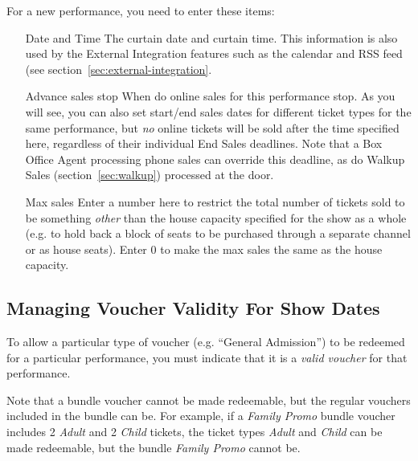 For a new performance, you need to enter these items:
\begin{enumerate}
\item[Date and Time] The curtain date and curtain time.  This
  information is also used by the External Integration features such as
  the calendar and RSS feed (see section~\ref{sec:external-integration}.
\item[Advance sales stop] When do online sales for this performance
  stop.  As you will see, you can also set start/end sales dates for
  different ticket types for the same performance, but \emph{no} online
  tickets will be sold after the time specified here, regardless of
  their individual End Sales deadlines.  Note that a Box Office Agent
  processing phone sales can override this deadline, as do Walkup
  Sales (section~\ref{sec:walkup}) processed at the door.
\item[Max sales] Enter a number here to restrict the total number of
  tickets sold to be something \emph{other} than the house capacity
  specified for the show as a whole (e.g. to hold back a block of seats
  to be purchased through a separate channel or as house seats).  Enter
  0 to make the max sales the same as the house capacity.
\end{enumerate}


\subsection{Managing Voucher Validity For Show Dates}

To allow a particular type of voucher (e.g. ``General Admission'') to be
redeemed for a particular performance, you must indicate that it is a
\emph{valid voucher} for that performance.


Note that a bundle voucher cannot be made redeemable, but the regular
vouchers included in the bundle can be.  For example, if a \emph{Family
Promo} bundle voucher includes 2 \emph{Adult} and 2 \emph{Child} tickets, the
ticket types \emph{Adult} and \emph{Child} can be made redeemable, but the
bundle \emph{Family Promo} cannot be.

